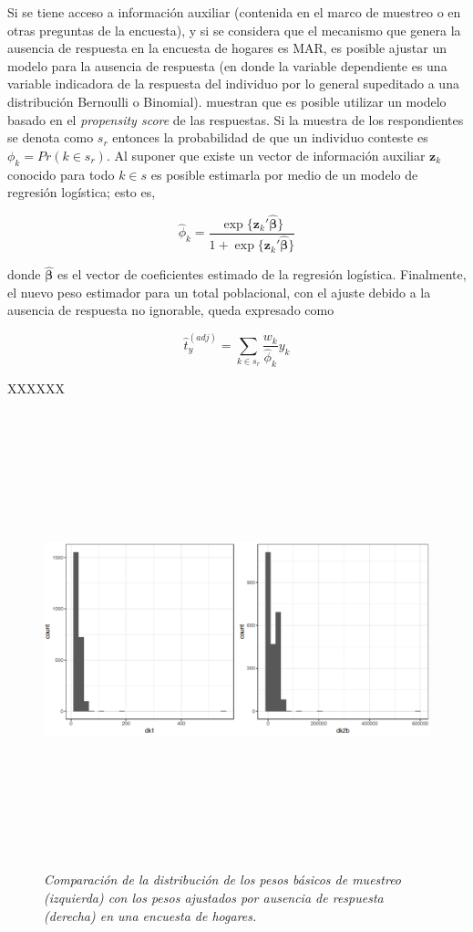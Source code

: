 Si se tiene acceso a información auxiliar (contenida en el marco de muestreo o en otras preguntas de la encuesta), y si se considera que el mecanismo que genera la ausencia de respuesta en la encuesta de hogares es MAR, es posible ajustar un modelo para la ausencia de respuesta (en donde la variable dependiente es una variable indicadora de la respuesta del individuo por lo general supeditado a una distribución Bernoulli o Binomial). \citet{Kim_Riddles_2012} muestran que es posible utilizar un modelo basado en el \emph{propensity score} de las respuestas. Si la muestra de los respondientes se denota como \(s_r\) entonces la probabilidad de que un individuo conteste es \(\phi_k = Pr(k \in s_r)\). Al suponer que existe un vector de información auxiliar \(\mathbf{z}_k\) conocido para todo \(k\in s\) es posible estimarla por medio de un modelo de regresión logística; esto es,

\[
\hat{\phi}_k = \frac{\exp\{\mathbf{z}_k'\hat{\boldsymbol{\beta}}\}}{1 + \exp\{\mathbf{z}_k'\hat{\boldsymbol{\beta}}\}}
\]

donde \(\hat{\mathbf{\beta}}\) es el vector de coeficientes estimado de la regresión logística. Finalmente, el nuevo peso estimador para un total poblacional, con el ajuste debido a la ausencia de respuesta no ignorable, queda expresado como

\[
\hat{t}_{y}^{(adj)}= \sum_{k\in s_r} \frac{w_k}{\hat{\phi}_k}y_k
\]

XXXXXX

\begin{figure}
\centering
\includegraphics[width=\textwidth,height=5.20833in]{Pics/17.png}
\caption{\emph{Comparación de la distribución de los pesos básicos de muestreo (izquierda) con los pesos ajustados por ausencia de respuesta (derecha) en una encuesta de hogares.}}
\end{figure}

